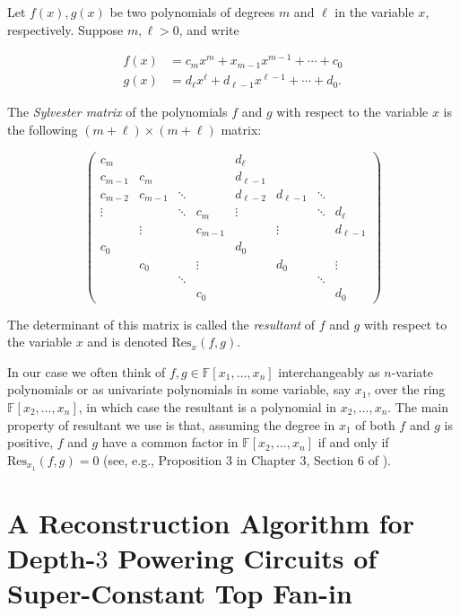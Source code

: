 \documentclass[12pt]{article}
\newcommand{\F}{\mathbb{F}}
\newcommand{\Res}{\mathrm{Res}}
\begin{document}
	
	Let $f(x), g(x)$ be two polynomials of degrees $m$ and $\ell$ in the variable $x$, respectively. Suppose $m,\ell > 0$, and write
	
	\begin{align*}
		f(x) &= c_m x^m + x_{m-1}x^{m-1} + \cdots + c_0 \\
		g(x) &= d_\ell x^\ell + d_{\ell-1} x^{\ell-1} + \cdots + d_0.
	\end{align*}
	
	The \emph{Sylvester matrix} of the polynomials $f$ and $g$ with respect to the variable $x$ is the following $(m + \ell) \times (m+ \ell)$ matrix:
	
	\[
	\begin{pmatrix}
		c_m & & & &  d_\ell & & & \\
		c_{m-1} & c_m & &  & d_{\ell-1} & & \\
		c_{m-2} & c_{m-1} & \ddots & & d_{\ell-2} & d_{\ell-1} & \ddots & \\
		\vdots & & \ddots & c_{m} & \vdots & & \ddots & d_\ell \\
		& \vdots & & c_{m-1} & & \vdots & & d_{\ell-1} \\
		c_0 & & & & d_0 & & & \\
		& c_0 & & \vdots & & d_0 & & \vdots \\
		& & \ddots & & & & \ddots & \\
		& & & c_0 & & & & d_0
	\end{pmatrix}
	\]
	
	The determinant of this matrix is called the \emph{resultant} of $f$ and $g$ with respect to the variable $x$ and is denoted $\Res_x (f,g)$. 
	
	In our case we often think of $f, g \in \F[x_1, \ldots, x_n]$ interchangeably as $n$-variate polynomials or as univariate polynomials in some variable, say $x_1$, over the ring $\F[x_2, \ldots, x_n]$, in which case the resultant is a polynomial in $x_2, \ldots, x_n$. The main property of resultant we use is that, assuming the degree in $x_1$ of both $f$ and $g$ is positive, $f$ and $g$ have a common factor in $\F[x_2, \ldots, x_n]$ if and only if $\Res_{x_1} (f,g) = 0$ (see, e.g., Proposition 3 in Chapter 3, Section 6 of \cite{CLO07}).
	
	
	
	
	
	
	\section{A Reconstruction Algorithm for Depth-$3$ Powering Circuits of Super-Constant Top Fan-in}
	\label{sec:sumpowsumk}
	
\end{document}
